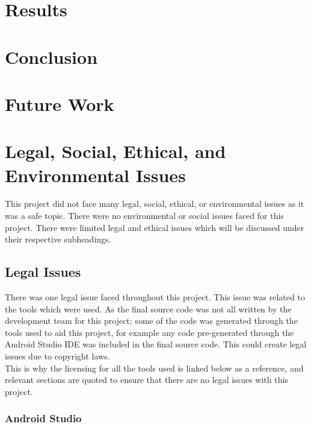 \documentclass{article}
\begin{document}


\section{Results}

\section{Conclusion}

\section{Future Work}

\section{Legal, Social, Ethical, and Environmental Issues}

This project did not face many legal, social, ethical, or environmental issues as it was a safe topic. There were no environmental or social issues faced for this project. There were limited legal and ethical issues which will be discussed under their respective subheadings. 

\subsection{Legal Issues}

There was one legal issue faced throughout this project. This issue was related to the tools which were used. As the final source code was not all written by the development team for this project; some of the code was generated through the tools used to aid this project, for example any code pre-generated through the Android Studio IDE was included in the final source code. This could create legal issues due to copyright laws. \\

This is why the licensing for all the tools used is linked below as a reference, and relevant sections are quoted to ensure that there are no legal issues with this project. \\

\subsubsection{Android Studio}
\end{document}

